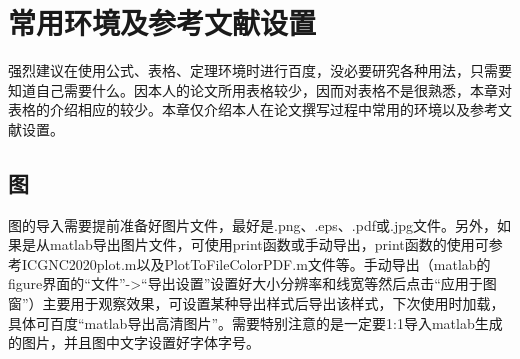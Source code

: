 
\chapter{常用环境及参考文献设置}
强烈建议在使用公式、表格、定理环境时进行百度，没必要研究各种用法，只需要知道自己需要什么。因本人的论文所用表格较少，因而对表格不是很熟悉，本章对表格的介绍相应的较少。本章仅介绍本人在论文撰写过程中常用的环境以及参考文献设置。

\section{图}
图的导入需要提前准备好图片文件，最好是.png、.eps、.pdf或.jpg文件。另外，如果是从matlab导出图片文件，可使用print函数或手动导出，print函数的使用可参考ICGNC2020plot.m以及PlotToFileColorPDF.m文件等。手动导出（matlab的figure界面的“文件”->“导出设置”设置好大小分辨率和线宽等然后点击“应用于图窗”）主要用于观察效果，可设置某种导出样式后导出该样式，下次使用时加载，具体可百度“matlab导出高清图片”。需要特别注意的是一定要1:1导入matlab生成的图片，并且图中文字设置好字体字号。

